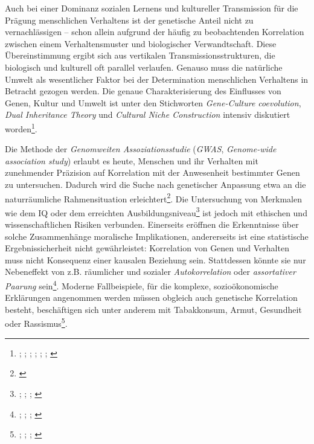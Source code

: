 \documentclass[openany,twoside,twocolumn]{book}
\let\rmarkdownfootnote\footnote%
\def\footnote{\protect\rmarkdownfootnote}
\begin{document}
Auch bei einer Dominanz sozialen Lernens und kultureller Transmission
für die Prägung menschlichen Verhaltens ist der genetische Anteil nicht
zu vernachlässigen -- schon allein aufgrund der häufig zu beobachtenden
Korrelation zwischen einem Verhaltensmuster und biologischer
Verwandtschaft. Diese Übereinstimmung ergibt sich aus vertikalen
Transmissionsstrukturen, die biologisch und kulturell oft parallel
verlaufen. Genauso muss die natürliche Umwelt als wesentlicher Faktor
bei der Determination menschlichen Verhaltens in Betracht gezogen
werden. Die genaue Charakterisierung des Einflusses von Genen, Kultur
und Umwelt ist unter den Stichworten \emph{Gene-Culture coevolution},
\emph{Dual Inheritance Theory} und \emph{Cultural Niche Construction}
intensiv diskutiert worden\footnote{\textcite{aoki_gene-culture_2017};
  \textcite{boyd_culture_1985}; \textcite{cavalli-sforza_cultural_1981};
  \textcite{chudek_culturegene_2011}; \textcite{feldman_aspects_1979};
  \textcite{mesoudi_towards_2006}; \textcite{richerson_dual_1978}}.

Die Methode der \emph{Genomweiten Assoziationsstudie} (\emph{GWAS},
\emph{Genome-wide association study}) erlaubt es heute, Menschen und ihr
Verhalten mit zunehmender Präzision auf Korrelation mit der Anwesenheit
bestimmter Genen zu untersuchen. Dadurch wird die Suche nach genetischer
Anpassung etwa an die naturräumliche Rahmensituation
erleichtert\footnote{\textcite{berg_population_2014}}. Die Untersuchung
von Merkmalen wie dem IQ oder dem erreichten Ausbildungsniveau\footnote{\textcite{benyamin_childhood_2014};
  \textcite{davies_genome-wide_2011}; \textcite{minkov_genetic_2015};
  \textcite{okbay_genome-wide_2016}} ist jedoch mit ethischen und
wissenschaftlichen Risiken verbunden. Einerseits eröffnen die
Erkenntnisse über solche Zusammenhänge moralische Implikationen,
andererseits ist eine statistische Ergebnissicherheit nicht
gewährleistet: Korrelation von Genen und Verhalten muss nicht Konsequenz
einer kausalen Beziehung sein. Stattdessen könnte sie nur Nebeneffekt
von z.B. räumlicher und sozialer \emph{Autokorrelation} oder
\emph{assortativer Paarung} sein\footnote{\textcite{abdellaoui_educational_2015};
  \textcite{domingue_genetic_2014}; \textcite{okbay_genome-wide_2016};
  \textcite{piffer_review_2015}}. Moderne Fallbeispiele, für die
komplexe, sozioökonomische Erklärungen angenommen werden müssen obgleich
auch genetische Korrelation besteht, beschäftigen sich unter anderem mit
Tabakkonsum, Armut, Gesundheit oder Rassismus\footnote{\textcite{maes_genetic_2006};
  \textcite{marden_african_2016};
  \textcite{nugent_geneenvironment_2011};
  \textcite{paradies_racism_2015}}.
\end{document}
